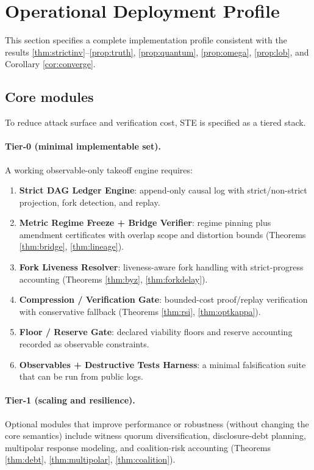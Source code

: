 \documentclass[11pt,a4paper]{article}
\theoremstyle{definition}
\theoremstyle{remark}
\begin{document}
\section{Operational Deployment Profile}
This section specifies a complete implementation profile consistent with the results \ref{thm:strictinv}--\ref{prop:truth}, \ref{prop:quantum}, \ref{prop:omega}, \ref{prop:lob}, and Corollary \ref{cor:converge}.

\subsection{Core modules}
To reduce attack surface and verification cost, STE is specified as a tiered stack.

\paragraph{Tier-0 (minimal implementable set).}
A working observable-only takeoff engine requires:
\begin{enumerate}
  \item \textbf{Strict DAG Ledger Engine}: append-only causal log with strict/non-strict projection, fork detection, and replay.
  \item \textbf{Metric Regime Freeze + Bridge Verifier}: regime pinning plus amendment certificates with overlap scope and distortion bounds (Theorems \ref{thm:bridge}, \ref{thm:lineage}).
  \item \textbf{Fork Liveness Resolver}: liveness-aware fork handling with strict-progress accounting (Theorems \ref{thm:byz}, \ref{thm:forkdelay}).
  \item \textbf{Compression / Verification Gate}: bounded-cost proof/replay verification with conservative fallback (Theorems \ref{thm:rsi}, \ref{thm:optkappa}).
  \item \textbf{Floor / Reserve Gate}: declared viability floors and reserve accounting recorded as observable constraints.
  \item \textbf{Observables + Destructive Tests Harness}: a minimal falsification suite that can be run from public logs.
\end{enumerate}

\paragraph{Tier-1 (scaling and resilience).}
Optional modules that improve performance or robustness (without changing the core semantics) include witness quorum diversification, disclosure-debt planning, multipolar response modeling, and coalition-risk accounting (Theorems \ref{thm:debt}, \ref{thm:multipolar}, \ref{thm:coalition}).
\end{document}

